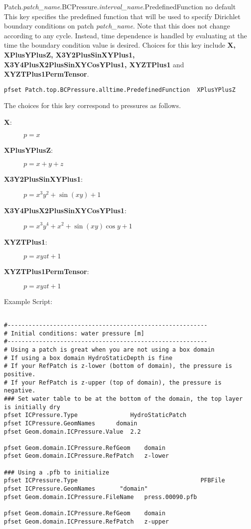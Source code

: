 {Patch.{\em patch\_name}.BCPressure.{\em interval\_name}.PredefinedFunction}
{no default}
{This key specifies the predefined function that will be used to specify
Dirichlet boundary conditions on patch {\em patch\_name}.
Note that this does not change according to any cycle.
Instead, time dependence is handled by
evaluating at the time the boundary condition value is desired.
Choices for this key include {\bf X, XPlusYPlusZ, X3Y2PlusSinXYPlus1,
X3Y4PlusX2PlusSinXYCosYPlus1, XYZTPlus1} and {\bf XYZTPlus1PermTensor}.
}
\begin{display}\begin{verbatim}
pfset Patch.top.BCPressure.alltime.PredefinedFunction  XPlusYPlusZ
\end{verbatim}\end{display}
The choices for this key correspond to pressures as follows.
\begin{description}
\item[{\bf X}: ] $p = x$
\item[{\bf XPlusYPlusZ}: ] $p = x + y + z$
\item[{\bf X3Y2PlusSinXYPlus1}: ] $p = x^3 y^2 + \sin(xy) + 1$
\item[{\bf X3Y4PlusX2PlusSinXYCosYPlus1}: ]
$p = x^3 y^4 + x^2 + \sin(xy)\cos y + 1$
\item[{\bf XYZTPlus1}: ] $p = xyzt + 1$
\item[{\bf XYZTPlus1PermTensor}: ] $p = xyzt + 1$
\end{description}

Example Script:
\begin{display}\begin{verbatim}

#---------------------------------------------------------
# Initial conditions: water pressure [m]
#---------------------------------------------------------
# Using a patch is great when you are not using a box domain
# If using a box domain HydroStaticDepth is fine
# If your RefPatch is z-lower (bottom of domain), the pressure is positive.
# If your RefPatch is z-upper (top of domain), the pressure is negative.
### Set water table to be at the bottom of the domain, the top layer is initially dry
pfset ICPressure.Type				HydroStaticPatch
pfset ICPressure.GeomNames		domain
pfset Geom.domain.ICPressure.Value	2.2

pfset Geom.domain.ICPressure.RefGeom	domain
pfset Geom.domain.ICPressure.RefPatch	z-lower

### Using a .pfb to initialize
pfset ICPressure.Type                                   PFBFile
pfset ICPressure.GeomNames		 "domain"
pfset Geom.domain.ICPressure.FileName	press.00090.pfb

pfset Geom.domain.ICPressure.RefGeom	domain
pfset Geom.domain.ICPressure.RefPatch	z-upper
\end{verbatim}\end{display}

